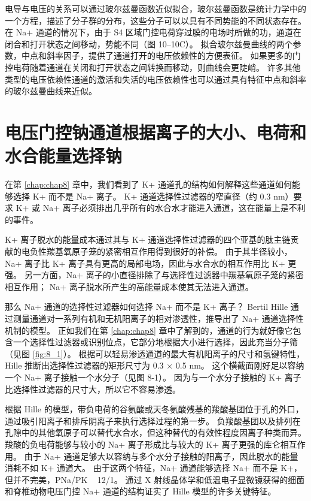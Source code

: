 电导与电压的关系可以通过玻尔兹曼函数近似拟合，玻尔兹曼函数是统计力学中的一个方程，描述了分子群的分布，这些分子可以以具有不同势能的不同状态存在。 
在 Na+ 通道的情况下，由于 S4 区域门控电荷穿过膜的电场时所做的功，通道在闭合和打开状态之间移动，势能不同（图 10–10C）。 
拟合玻尔兹曼曲线的两个参数，中点和斜率因子，提供了通道打开的电压依赖性的方便表征。 
如果更多的门控电荷随着通道在关闭和打开状态之间转换而移动，则曲线会更陡峭。 
许多其他类型的电压依赖性通道的激活和失活的电压依赖性也可以通过具有特征中点和斜率的玻尔兹曼曲线来近似。


\section{电压门控钠通道根据离子的大小、电荷和水合能量选择钠}

在第 \ref{chap:chap8} 章中，我们看到了 K+ 通道孔的结构如何解释这些通道如何能够选择 K+ 而不是 Na+ 离子。 
K+ 通道选择性过滤器的窄直径（约 0.3 nm）要求 K+ 或 Na+ 离子必须排出几乎所有的水合水才能进入通道，这在能量上是不利的事件。


K+ 离子脱水的能量成本通过其与 K+ 通道选择性过滤器的四个亚基的肽主链贡献的电负性羰基氧原子笼的紧密相互作用得到很好的补偿。 
由于其半径较小，Na+ 离子比 K+ 离子具有更高的局部电场，因此与水合水的相互作用比 K+ 更强。 
另一方面，Na+ 离子的小直径排除了与选择性过滤器中羰基氧原子笼的紧密相互作用； 
Na+ 离子脱水所产生的高能量成本使其无法进入通道。


那么 Na+ 通道的选择性过滤器如何选择 Na+ 而不是 K+ 离子？ 
Bertil Hille 通过测量通道对一系列有机和无机阳离子的相对渗透性，推导出了 Na+ 通道选择性机制的模型。 
正如我们在第 \ref{chap:chap8} 章中了解到的，通道的行为就好像它包含一个选择性过滤器或识别位点，它部分地根据大小进行选择，因此充当分子筛（见图 \ref{fig:8_1}）。 
根据可以轻易渗透通道的最大有机阳离子的尺寸和氢键特性，Hille 推断出选择性过滤器的矩形尺寸为 0.3 × 0.5 nm。 
这个横截面刚好足以容纳一个 Na+ 离子接触一个水分子（见图 8-1）。 
因为与一个水分子接触的 K+ 离子比选择性过滤器的尺寸大，所以它不容易渗透。


根据 Hille 的模型，带负电荷的谷氨酸或天冬氨酸残基的羧酸基团位于孔的外口，通过吸引阳离子和排斥阴离子来执行选择过程的第一步。 
负羧酸基团以及排列在孔隙中的其他氧原子可以替代水合水，但这种替代的有效性程度因离子种类而异。 
羧酸的负电荷能够与较小的 Na+ 离子形成比与较大的 K+ 离子更强的库仑相互作用。 
由于 Na+ 通道足够大以容纳与多个水分子接触的阳离子，因此脱水的能量消耗不如 K+ 通道大。 
由于这两个特征，Na+ 通道能够选择 Na+ 而不是 K+，但并不完美，PNa/PK ~ 12/1。 
通过 X 射线晶体学和低温电子显微镜获得的细菌和脊椎动物电压门控 Na+ 通道的结构证实了 Hille 模型的许多关键特征。


